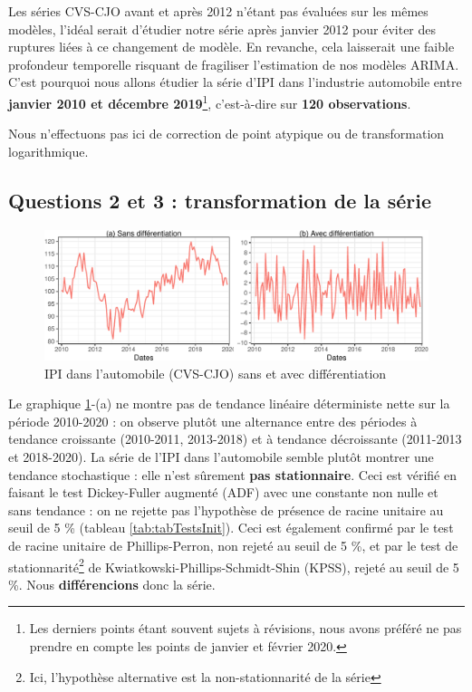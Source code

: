\documentclass[,french]{article}
\begin{document}
Les séries CVS-CJO avant et après 2012 n'étant pas évaluées sur les mêmes modèles, l'idéal serait d'étudier notre série après janvier 2012 pour éviter des ruptures liées à ce changement de modèle. En revanche, cela laisserait une faible profondeur temporelle risquant de fragiliser l'estimation de nos modèles ARIMA.
C'est pourquoi nous allons étudier la série d'IPI dans l'industrie automobile entre \textbf{janvier 2010 et décembre 2019}\footnote{Les derniers points étant souvent sujets à révisions, nous avons préféré ne pas prendre en compte les points de janvier et février 2020.}, c'est-à-dire sur \textbf{120 observations}.

Nous n'effectuons pas ici de correction de point atypique ou de transformation logarithmique.

\hypertarget{questions-2-et-3-transformation-de-la-suxe9rie}{%
\subsection{Questions 2 et 3 : transformation de la série}\label{questions-2-et-3-transformation-de-la-suxe9rie}}

\begin{figure}

{\centering \includegraphics{img/rmd-compGraph-1} 

}

\caption{IPI dans l'automobile (CVS-CJO) sans et avec différentiation}\label{fig:compGraph}
\end{figure}

Le graphique \ref{fig:compGraph}-(a) ne montre pas de tendance linéaire déterministe nette sur la période 2010-2020 : on observe plutôt une alternance entre des périodes à tendance croissante (2010-2011, 2013-2018) et à tendance décroissante (2011-2013 et 2018-2020).
La série de l'IPI dans l'automobile semble plutôt montrer une tendance stochastique : elle n'est sûrement \textbf{pas stationnaire}. Ceci est vérifié en faisant le test Dickey-Fuller augmenté (ADF) avec une constante non nulle et sans tendance : on ne rejette pas l'hypothèse de présence de racine unitaire au seuil de 5 \% (tableau \ref{tab:tabTestsInit}).
Ceci est également confirmé par le test de racine unitaire de Phillips-Perron, non rejeté au seuil de 5 \%, et par le test de stationnarité\footnote{Ici, l'hypothèse alternative est la non-stationnarité de la série} de Kwiatkowski-Phillips-Schmidt-Shin (KPSS), rejeté au seuil de 5 \%. Nous \textbf{différencions} donc la série.
\end{document}
